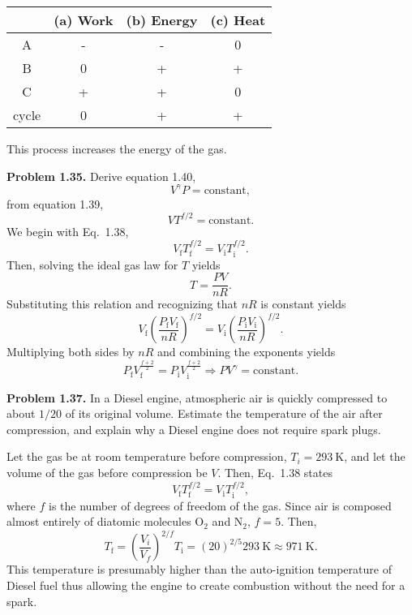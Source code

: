 \documentclass[a4paper, 12pt]{config/homework}
\begin{document}
\bigskip\noindent
\begin{center}
\begin{tabular}{c|c|c|c}
& (a) Work & (b) Energy & (c) Heat \\ \hline \hline
A & - & - & 0 \\ \hline
B & 0 & + & + \\ \hline
C & + & + & 0 \\ \hline \hline
cycle & 0 & + & + \\ \hline
\end{tabular}
\end{center}

\noindent
This process increases the energy of the gas.

\bigskip\noindent \textbf{Problem 1.35.} Derive equation 1.40,
\[V^\gamma P = \text{constant},\]
from equation 1.39,
\[VT^{f/2} = \text{constant}.\]
\bigskip\noindent
We begin with Eq.\ 1.38,
\[V_\text{f}T_\text{f}^{f/2} = V_\text{i}T_\text{i}^{f/2}.\]
Then, solving the ideal gas law for \(T\) yields
\[T = \frac{PV}{nR}.\]
Substituting this relation and recognizing that \(nR\) is constant yields
\[V_\text{f}\left(\frac{P_\text{f}V_\text{f}}{nR}\right)^{f/2} = V_\text{i}\left(\frac{P_\text{i}V_\text{i}}{nR}\right)^{f/2}.\]
Multiplying both sides by \(nR\) and combining the exponents yields
\[P_\text{f}V_\text{f}^{\frac{f+2}{2}} = P_\text{i}V_\text{i}^{\frac{f+2}{2}} \Rightarrow PV^\gamma = \text{constant}.\]


\pagebreak\noindent
\textbf{Problem 1.37.} In a Diesel engine, atmospheric air is quickly compressed to about \(1/20\) of its original volume. Estimate the temperature of the air after compression, and explain why a Diesel engine does not require spark plugs.

\bigskip\noindent
Let the gas be at room temperature before compression, \(T_i = \qty{293}{\kelvin}\), and let the volume of the gas before compression be \(V\). Then, Eq.\ 1.38 states
\[V_\text{f}T_\text{f}^{f/2} = V_\text{i}T_\text{i}^{f/2},\]
where \(f\) is the number of degrees of freedom of the gas. Since air is composed almost entirely of diatomic molecules \(\text{O}_2\) and \(\text{N}_2\), \(f=5\). Then,
\[T_\text{f} = \left(\frac{V_i}{V_f}\right)^{2/f} T_\text{i} = (20)^{2/5}\qty{293}{\kelvin} \approx \qty{971}{\kelvin}.\]
This temperature is presumably higher than the auto-ignition temperature of Diesel fuel thus allowing the engine to create combustion without the need for a spark.
\end{document}
